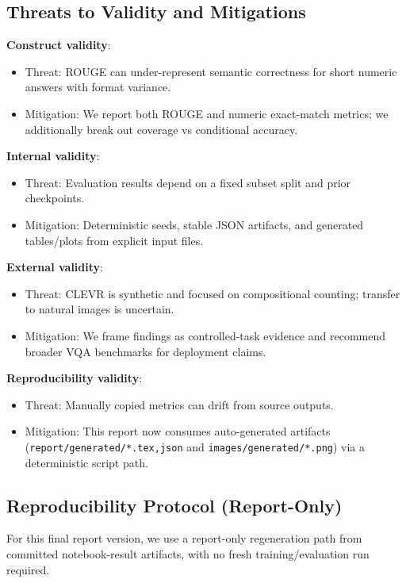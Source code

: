 \documentclass[conference]{IEEEtran}
\begin{document}
\subsection{Threats to Validity and Mitigations}

\textbf{Construct validity}:
\begin{itemize}
    \item Threat: ROUGE can under-represent semantic correctness for short numeric answers with format variance.
    \item Mitigation: We report both ROUGE and numeric exact-match metrics; we additionally break out coverage vs conditional accuracy.
\end{itemize}

\textbf{Internal validity}:
\begin{itemize}
    \item Threat: Evaluation results depend on a fixed subset split and prior checkpoints.
    \item Mitigation: Deterministic seeds, stable JSON artifacts, and generated tables/plots from explicit input files.
\end{itemize}

\textbf{External validity}:
\begin{itemize}
    \item Threat: CLEVR is synthetic and focused on compositional counting; transfer to natural images is uncertain.
    \item Mitigation: We frame findings as controlled-task evidence and recommend broader VQA benchmarks for deployment claims.
\end{itemize}

\textbf{Reproducibility validity}:
\begin{itemize}
    \item Threat: Manually copied metrics can drift from source outputs.
    \item Mitigation: This report now consumes auto-generated artifacts (\texttt{report/generated/*.tex,json} and \texttt{images/generated/*.png}) via a deterministic script path.
\end{itemize}

\subsection{Reproducibility Protocol (Report-Only)}

For this final report version, we use a report-only regeneration path from committed notebook-result artifacts, with no fresh training/evaluation run required.
\end{document}
